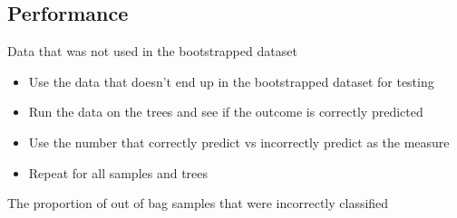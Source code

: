 \documentclass{article}[18pt]
\begin{document}
\subsection{Performance}
\begin{definition}
Data that was not used in the bootstrapped dataset
\end{definition}
\begin{itemize}
	\item Use the data that doesn't end up in the bootstrapped dataset for testing
	\item Run the data on the trees and see if the outcome is correctly predicted
	\item Use the number that correctly predict vs incorrectly predict as the measure
	\item Repeat for all samples and trees
\end{itemize}
\begin{definition}
	The proportion of out of bag samples that were incorrectly classified
\end{definition}
\end{document}
